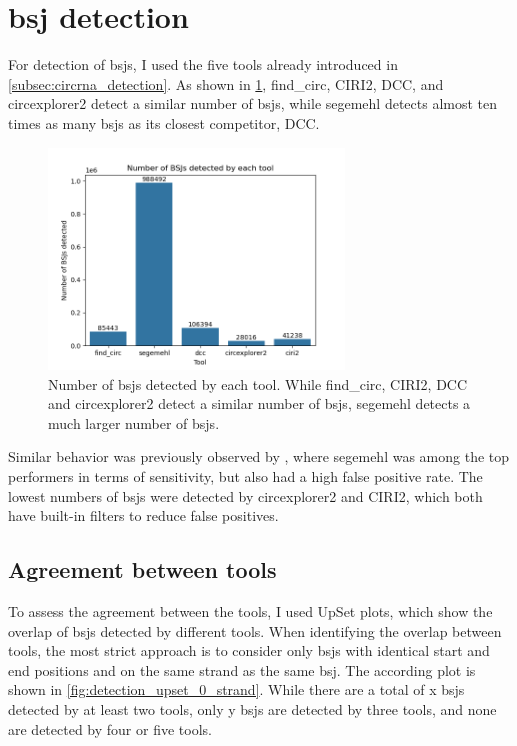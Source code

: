 \section{\Acrfull{bsj} detection}

For detection of \gls{bsj}s, I used the five tools already introduced in
\cref{subsec:circrna_detection}.
As shown in \cref{fig:detection_bars}, find\_circ, CIRI2, DCC, and
circexplorer2 detect a similar number of \gls{bsj}s, while segemehl detects
almost ten times as many \gls{bsj}s as its closest competitor, DCC.

\begin{figure}[ht] \centering

    \includegraphics[width=0.7\textwidth]{chapters/4_results_and_discussion/figures/detection/n_bsjs_detected.png}
    \caption{Number of \gls{bsj}s detected by each tool.
        While find\_circ, CIRI2, DCC and circexplorer2 detect a similar number of
        \gls{bsj}s, segemehl detects a much larger number of \gls{bsj}s.
    }
    \label{fig:detection_bars}
\end{figure}
Similar behavior was previously observed by \textcite{zeng_comprehensive_2017},
where segemehl was among the top performers in terms of sensitivity, but also
had a high false positive rate.
The lowest numbers of \gls{bsj}s were detected by circexplorer2 and CIRI2,
which both have built-in filters to reduce false
positives\supercite{zhang_diverse_2016,gao_circular_2018}.

\subsection{Agreement between tools}

To assess the agreement between the tools, I used UpSet plots, which show the
overlap of \gls{bsj}s detected by different tools.
When identifying the overlap between tools, the most strict approach is to
consider only \gls{bsj}s with identical start and end positions and on the same
strand as the same \gls{bsj}.
The according plot is shown in \cref{fig:detection_upset_0_strand}.
While there are a total of x \gls{bsj}s detected by at least two tools, only y
\gls{bsj}s are detected by three tools, and none are detected by four or five
tools.

